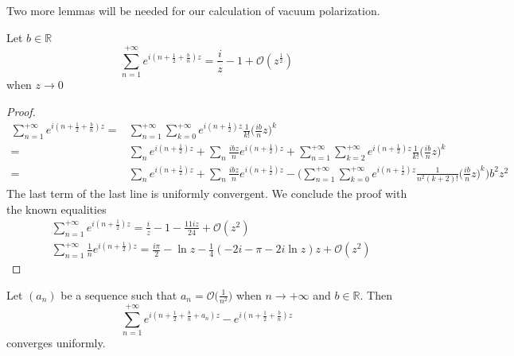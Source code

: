 Two more lemmas will be needed for our calculation of vacuum polarization.
\begin{lemma}
Let $b\in\mathbb{R}$
\begin{equation*}
\sum_{n=1}^{+\infty} e^{i(n + \frac 1 2+\frac b n)z} = \frac i z - 1 + \mathcal{O}(z^{\frac 1 2})
\end{equation*}
when $z\rightarrow 0 $
\end{lemma}
\begin{proof}
\begin{equation*}
\begin{split}
\sum_{n=1}^{+\infty} e^{i(n + \frac 1 2 +\frac b n)z} = & 
\sum_{n=1}^{+\infty} \sum_{k=0}^{+\infty} e^{i(n + \frac 1 2)z} \frac{1}{k!}\big(\frac{ib}{n}z\big)^k \\
%
= & \sum_n e^{i(n+\frac 1 2 )z} + \sum_n \frac{ibz}{n}e^{i(n+\frac 1 2 )z} + \sum_{n=1}^{+\infty} \sum_{k=2}^{+\infty} e^{i(n+\frac 1 2)z} \frac{1}{k!}\big(\frac{ib}{n}z\big)^k  \\
%
= & \sum_n e^{i(n+\frac 1 2)z} + \sum_n \frac{ibz}{n}e^{i(n+\frac 1 2)z} - 
\bigg(\sum_{n=1}^{+\infty} \sum_{k=0}^{+\infty} 
e^{i(n+\frac 1 2)z} \frac{1}{n^2(k+2)!}\big(\frac{ib}{n}z\big)^k 
\bigg)b^2z^2
\end{split}
\end{equation*}
The last term of the last line is uniformly convergent.
We conclude the proof with the known equalities
\begin{equation*}
\begin{split}
& \sum_{n=1}^{+\infty}e^{i(n + \frac 1 2 )z} = 
\frac i z - 1 - \frac{11iz}{24} + \mathcal{O}(z^2) \\
%
& \sum_{n=1}^{+\infty}\frac 1 n e^{i(n+\frac 1 2)z} =
\frac{i\pi}{2} - \ln z - \frac 1 4 (-2i - \pi - 2i\ln z)z + \mathcal{O}(z^2)
\end{split}
\end{equation*}
\end{proof}
%
\begin{lemma}\label{wen-lemmacvu}
Let $(a_n)$ be a sequence such that $a_n = \mathcal{O}\big(\frac{1}{n^2})$ when $n\rightarrow+\infty$ and $b\in\mathbb{R}$. Then
\begin{equation*}
\sum_{n=1}^{+\infty} e^{i(n+\frac 1 2+\frac{b}{n}+a_n)z } - e^{i(n+\frac 1 2+\frac{b}{n})z }
\end{equation*}
converges uniformly.
\end{lemma}

